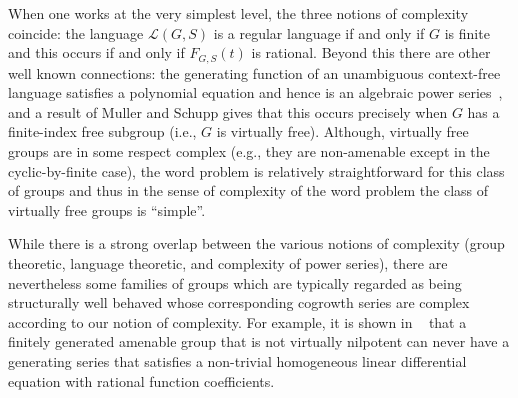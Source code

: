 \documentclass[11pt]{amsart}
\theoremstyle{definition}
\begin{document}
When one works at the very simplest level, the three notions of complexity coincide: the language $\mathcal{L}(G,S)$ is a regular language if and only if $G$ is finite~\cite{anisimov} and this occurs if and only if $F_{G,S}(t)$ is rational.  Beyond this there are other well known connections: the generating function of an unambiguous context-free language satisfies a polynomial equation and hence is an
algebraic power series~\cite[Chapter III]{kuich}, and a result of Muller and Schupp \cite{muller} gives that this occurs precisely when $G$ has a finite-index free subgroup (i.e., $G$ is virtually free). 
Although, virtually
free groups are in some respect complex (e.g., they are non-amenable except in the cyclic-by-finite case), the word problem is relatively straightforward for this class of groups and thus in the sense of complexity of the word problem the class of virtually free groups is ``simple''. 

While there is a strong overlap between the various notions of
complexity (group theoretic, language theoretic, and complexity of
power series), there are nevertheless some families of groups which
are typically regarded as being structurally well behaved whose
corresponding cogrowth series are complex according to our notion of
complexity.  For example, it is shown in ~\cite{BeMi20} that a
finitely generated amenable group that is not virtually nilpotent can
never have a generating series that satisfies a non-trivial
homogeneous linear differential equation with rational function
coefficients.
\end{document}

